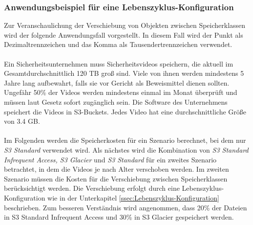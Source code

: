 \subsubsection{Anwendungsbeispiel für eine Lebenszyklus-Konfiguration}\label{Anwendungsbeispiel-Leben-Konfig}
Zur Veranschaulichung der Verschiebung von Objekten zwischen Speicherklassen wird der folgende Anwendungsfall vorgestellt. In diesem Fall wird der Punkt als Dezimaltrennzeichen und das Komma als Tausendertrennzeichen verwendet. 
\\\\
Ein Sicherheitsunternehmen muss Sicherheitsvideos speichern, die aktuell im Gesamtdurchschnittlich 120 TB groß sind. Viele von ihnen werden mindestens 5 Jahre lang aufbewahrt, falls sie vor Gericht als Beweismittel dienen sollten. Ungefähr 50\% der Videos werden mindestens einmal im Monat überprüft und müssen laut Gesetz sofort zugänglich sein. Die Software des Unternehmens speichert die Videos in S3-Buckets. Jedes Video hat eine durchschnittliche Größe von 3.4 GB.
\\\\
Im Folgenden werden die Speicherkosten für ein Szenario berechnet, bei dem nur \textit{S3 Standard} verwendet wird. Als nächstes wird die Kombination von \textit{S3 Standard Infrequent Access, S3 Glacier} und \textit{S3 Standard} für ein zweites Szenario betrachtet, in dem die Videos je nach Alter verschoben werden. Im zweiten Szenario müssen die Kosten für die Verschiebung zwischen Speicherklassen berücksichtigt werden. Die Verschiebung erfolgt durch eine Lebenszyklus-Konfiguration wie in der Unterkapitel \ref{ssec:Lebenszyklus-Konfiguration} beschrieben. Zum besseren Verständnis wird angenommen, dass 20\% der Dateien in S3 Standard Infrequent Access und 30\% in S3 Glacier gespeichert werden.
\newpage
